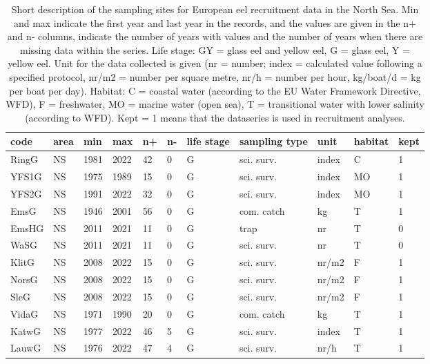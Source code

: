 \begin{table}[ht]
\centering
\caption{Short description of the sampling sites for European eel recruitment data in the North Sea. Min and max indicate the first year and last year in the records, and the values are given in the n+ and n- columns, indicate the number of years with values and the number of years when there are missing data within the series. Life stage: GY = glass eel and yellow eel, G = glass eel, Y = yellow eel. Unit for the data collected is given (nr = number; index = calculated value following a specified protocol, nr/m2 = number per square metre, nr/h = number per hour, kg/boat/d = kg per boat per day). Habitat: C = coastal water (according to the EU Water Framework Directive, WFD), F = freshwater, MO = marine water (open sea), T = transitional water with lower salinity (according to WFD). Kept = 1 means that the dataseries is used in recruitment analyses.} 
\label{statseriesG}
\begin{tabular}{p{1cm}p{1cm}p{1cm}p{1cm}p{0.8cm}p{0.8cm}p{1cm}p{2cm}p{2cm}p{1cm}p{1cm}}
  \hline
code & area & min & max & n+ & n- & life stage & sampling type & unit & habitat & kept \\ 
  \hline
RingG & NS & 1981 & 2022 & 42 & 0 & G & sci. surv. & index & C & 1 \\ 
  YFS1G & NS & 1975 & 1989 & 15 & 0 & G & sci. surv. & index & MO & 1 \\ 
  YFS2G & NS & 1991 & 2022 & 32 & 0 & G & sci. surv. & index & MO & 1 \\ 
  EmsG & NS & 1946 & 2001 & 56 & 0 & G & com. catch & kg & T & 1 \\ 
  EmsHG & NS & 2011 & 2021 & 11 & 0 & G & trap & nr & T & 0 \\ 
  WaSG & NS & 2011 & 2021 & 11 & 0 & G & sci. surv. & nr & T & 0 \\ 
  KlitG & NS & 2008 & 2022 & 15 & 0 & G & sci. surv. & nr/m2 & F & 1 \\ 
  NorsG & NS & 2008 & 2022 & 15 & 0 & G & sci. surv. & nr/m2 & F & 1 \\ 
  SleG & NS & 2008 & 2022 & 15 & 0 & G & sci. surv. & nr/m2 & F & 1 \\ 
  VidaG & NS & 1971 & 1990 & 20 & 0 & G & com. catch & kg & T & 1 \\ 
  KatwG & NS & 1977 & 2022 & 46 & 5 & G & sci. surv. & index & T & 1 \\ 
  LauwG & NS & 1976 & 2022 & 47 & 4 & G & sci. surv. & nr/h & T & 1 \\ 

\end{tabular}
\end{table}
